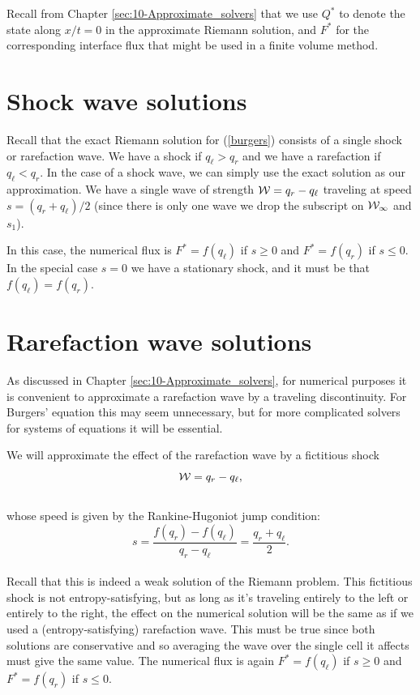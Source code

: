 \documentclass{SIAMbook2016}
\begin{document}
Recall from Chapter \ref{sec:10-Approximate_solvers} that we use \(Q^*\)
to denote the state along \(x/t = 0\) in the approximate Riemann
solution, and \(F^*\) for the corresponding interface flux that might be
used in a finite volume method.

\hypertarget{shock-wave-solutions}{%
\section{Shock wave solutions}\label{shock-wave-solutions}}

Recall that the exact Riemann solution for (\ref{burgers}) consists of a
single shock or rarefaction wave. We have a shock if \(q_\ell>q_r\) and
we have a rarefaction if \(q_\ell < q_r\). In the case of a shock wave,
we can simply use the exact solution as our approximation. We have a
single wave of strength \({\cal W} = q_r-q_\ell\) traveling at speed
\(s=(q_r+q_\ell)/2\) (since there is only one wave we drop the subscript
on \({\cal W_1}\) and \(s_1\)).

In this case, the numerical flux is \(F^*=f(q_\ell)\) if \(s\geq 0\) and
\(F^*=f(q_r)\) if \(s\leq 0\). In the special case \(s=0\) we have a
stationary shock, and it must be that \(f(q_\ell)=f(q_r)\).

\hypertarget{rarefaction-wave-solutions}{%
\section{Rarefaction wave solutions}\label{rarefaction-wave-solutions}}

As discussed in Chapter \ref{sec:10-Approximate_solvers}, for numerical
purposes it is convenient to approximate a rarefaction wave by a
traveling discontinuity. For Burgers' equation this may seem
unnecessary, but for more complicated solvers for systems of equations
it will be essential.

We will approximate the effect of the rarefaction wave by a fictitious
shock \[{\cal W} = q_r-q_\ell,\]\\
whose speed is given by the Rankine-Hugoniot jump condition:\\
\[s = \frac{f(q_r)-f(q_\ell)}{q_r-q_\ell} = \frac{q_r + q_\ell}{2}.\]\\
Recall that this is indeed a weak solution of the Riemann problem. This
fictitious shock is not entropy-satisfying, but as long as it's
traveling entirely to the left or entirely to the right, the effect on
the numerical solution will be the same as if we used a
(entropy-satisfying) rarefaction wave. This must be true since both
solutions are conservative and so averaging the wave over the single
cell it affects must give the same value. The numerical flux is again
\(F^*=f(q_\ell)\) if \(s\geq 0\) and \(F^*=f(q_r)\) if \(s \leq 0\).
\end{document}
